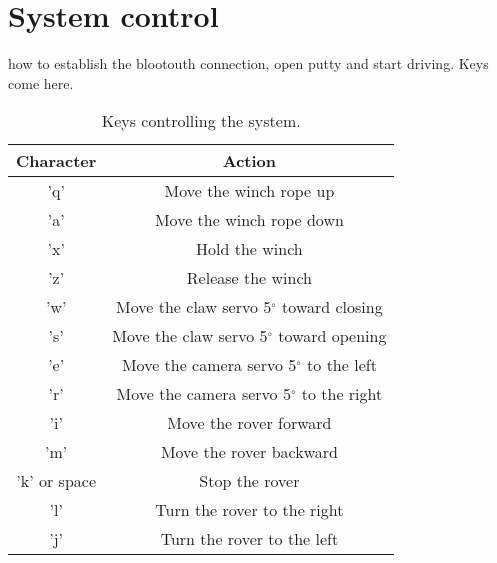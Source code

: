 \documentclass[letterpaper, 12 pt]{article}
\begin{document}
\section{System control}
how to establish the blootouth connection, open putty and start driving.
Keys come here.
\begin{table}[h]
\begin{center}
\caption{Keys controlling the system.}
\label{tab:keys}
\vspace{0.5cm}
\begin{tabular}{|c|c|}
\hline
\hspace{1cm} \textbf{Character} \hspace{1cm} & \textbf{Action}\\
\hline
'q' & Move the winch rope up\\
\hline
'a' & Move the winch rope down\\
\hline
'x' & Hold the winch\\
\hline
'z' & Release the winch\\
\hline 
'w' & Move the claw servo 5$^{\circ}$ toward closing\\
\hline  
's' & Move the claw servo 5$^{\circ}$ toward opening\\
\hline
'e' & Move the camera servo 5$^{\circ}$ to the left\\
\hline  
'r' & Move the camera servo 5$^{\circ}$ to the right\\
\hline
'i' & Move the rover forward\\
\hline
'm' & Move the rover backward\\
\hline
'k' or space & Stop the rover\\
\hline
'l' & Turn the rover to the right\\
\hline
'j' & Turn the rover to the left\\
\hline

\end{tabular}
\end{center}
\end{table}
%

\end{document}
